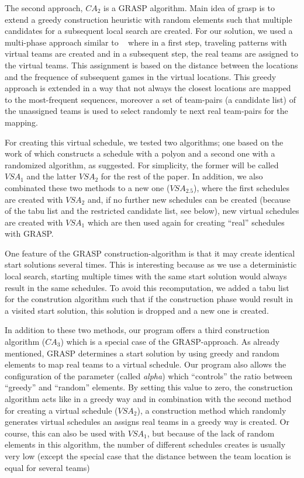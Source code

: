 \documentclass[a4paper,11pt]{article}
\begin{document}
The second approach, $CA_2$ is a \ac{GRASP} algorithm. Main idea of grasp is to extend a greedy construction heuristic with random elements such that multiple candidates for a subsequent local search are created.
For our solution, we used a multi-phase approach similar to ~\cite{Ribeiro04heuristicsfor} where in a first step, traveling patterns with virtual 
teams are created and in a subsequent step, the real teams are assigned to the virtual teams.
This assignment is based on the distance between the locations and the frequence of subsequent games in the virtual locations. 
This greedy approach is extended in a way that not always the closest locations are mapped to the most-frequent sequences, moreover a set of team-pairs (a candidate list) of the unassigned teams 
is used to select randomly te next real team-pairs for the mapping.

For creating this virtual schedule, we tested two algorithms; one based on the work of \cite{Gaspero07} which constructs a schedule with a polyon and a second one
with a randomized algorithm, as \cite{Anagnostopoulos06} suggested. For simplicity, the former will be called $VSA_1$ and the latter $VSA_2$ for the rest of the paper.
In addition, we also combinated these two methods to a new one ($VSA_{2.5}$), where the first schedules are created with $VSA_2$ and, if no further new schedules can be created
(because of the tabu list and the restricted candidate list, see below), new virtual schedules are created with $VSA_1$ which are then used again for creating ``real'' schedules with \ac{GRASP}.

One feature of the GRASP construction-algorithm is that it may create identical start solutions several times. 
This is interesting because as we use a deterministic local search, starting multiple times with the same start solution would always result in the same schedules.
To avoid this recomputation, we added a tabu list for the constrution algorithm such that if the construction phase would result in a visited start solution, this solution is dropped and a new one is created.

In addition to these two methods, our program offers a third construction algorithm ($CA_3$) which is a special case of the \ac{GRASP}-approach. As already mentioned, \ac{GRASP} determines a start solution
 by using greedy and random elements to map real teams to a virtual schedule. Our program also allows the configuration of the parameter (called \emph{alpha}) 
which ``controls'' the ratio between ``greedy'' and ``random'' elements. By setting this value to zero, the construction algorithm acts like in a greedy way and in combination with the second 
method for creating a virtual schedule ($VSA_2$), a construction method which randomly generates virtual schedules an assigns real teams in a greedy way is created.
Or course, this can also be used with $VSA_1$, but because of the lack of random elements in this algorithm, the number of different schedules creates is usually very low (except the special case that the 
distance between the team location is equal for several teams)
\end{document}
